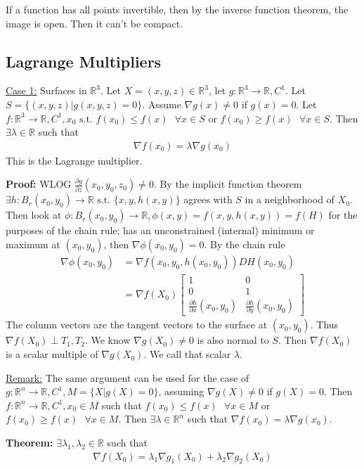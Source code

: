 \documentclass{article}
\newcommand*{\txt}[1]{\text{ #1 }}%
\newcommand*{\fora}{\txt{}\forall}%
\newcommand*{\rr}{\mathbb{R}}%
\newcommand*{\partials}[2]{\frac{\partial #1}{\partial #2}}%
\begin{document}
If a function has all points invertible, then by the inverse function theorem, the image is open. Then it can't be compact. 

\subsection{Lagrange Multipliers}

\underline{Case 1:} Surfaces in $\rr^3$. Let $X=(x,y,z)\in \rr^3$, let $g:\rr^3\to \rr, C^1$. Let $S=\{(x,y,z)|g(x,y,z)=0\}$. Assume $\nabla g(x)\neq 0$ if $g(x)=0$. Let $f:\rr^3\to \rr, C^1, x_0\txt{s.t.}f(x_0)\leq f(x)\fora x\in S$ or $f(x_0)\geq f(x)\fora x\in S$. Then $\exists \lambda\in \rr$ such that \begin{align*}
    \nabla f(x_0)=\lambda\nabla g(x_0)
\end{align*}This is the Lagrange multiplier.

\textbf{Proof:} WLOG $\partials{g}{z}(x_0,y_0,z_0)\neq 0$. By the implicit function theorem $\exists h:B_r(x_0,y_0)\to \rr\txt{s.t.}\{x,y,h(x,y)\}$ agrees with $S$ in a neighborhood of $X_0$. Then look at $\phi:B_r(x_0,y_0)\to \rr, \phi(x,y)=f(x,y,h(x,y))=f(H)$ for the purposes of the chain rule; has an unconstrained (internal) minimum or maximum at $(x_0,y_0)$, then $\nabla \phi (x_0,y_0)=0$. By the chain rule \begin{align*}
    \nabla \phi(x_0,y_0)&=\nabla f(x_0,y_0,h(x_0,y_0))DH(x_0,y_0)\\
    &=\nabla f(X_0)\begin{bmatrix}
        1 & 0 \\
        0 & 1 \\
        \partials{h}{x}(x_0,y_0) & \partials{h}{y}(x_0,y_0)
    \end{bmatrix}
\end{align*}The column vectors are the tangent vectors to the surface at $(x_0,y_0)$. Thus $\nabla f(X_0)\perp T_1, T_2$. We know $\nabla g(X_0)\neq 0$ is also normal to $S$. Then $\nabla f(X_0)$ is a scalar multiple of $\nabla g(X_0)$. We call that scalar $\lambda$.

\underline{Remark:} The same argument can be used for the case of $g:\rr^n\to \rr, C^1, M=\{X|g(X)=0\}$, assuming $\nabla g(X)\neq 0$ if $g(X)=0$. Then $f:\rr^n\to \rr, C^1, x_0\in M$ such that $f(x_0)\leq f(x)\fora x\in M$ or $f(x_0)\geq f(x)\fora x\in M$. Then $\exists \lambda\in \rr^n$ such that $\nabla f(x_0)=\lambda\nabla g(x_0)$.

\textbf{Theorem:} $\exists \lambda_1, \lambda_2\in \rr$ such that \begin{align*}
    \nabla f(X_0)=\lambda_1\nabla g_1(X_0)+\lambda_2\nabla g_2(X_0)
\end{align*}
\end{document}
